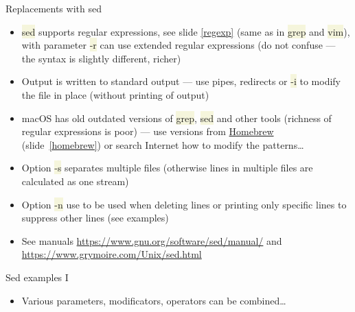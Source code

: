 \documentclass[compress, xelatex, 11pt, xcolor=svgnames, aspectratio=169,
	hyperref={
		bookmarks=true,
		unicode=true,
		colorlinks=true,
		pdftitle={Linux, command line and MetaCentrum},
		plainpages=false,
		pdfauthor={Vojtech Zeisek},
		pdfsubject={Course about use of Linux command line, writing shell scripts and using MetaCentrum of CESNET},
		pdfcreator={XeLaTeX},
		pdfkeywords={Linux, GNU, BASH, shell, command line, MetaCentrum},
		linkcolor=DarkRed, %
		anchorcolor=DarkBlue, %
		citecolor=Indigo, %
		filecolor=NavyBlue, %
		menucolor=DarkMagenta, %
		urlcolor=DarkBlue, %
		},
	url={hyphens, lowtilde} %
	]{beamer}
\renewcommand{\texttt}[1]{\colorbox{Beige}{{\ttfamily #1}}}
\begin{document}
\begin{frame}{Replacements with sed}
	\begin{itemize}
		\item \texttt{sed} supports regular expressions, see slide \ref{regexp} (same as in \texttt{grep} and \texttt{vim}), with parameter \texttt{-r} can use extended regular expressions (do not confuse --- the syntax is slightly different, richer)
		\item Output is written to standard output --- use pipes, redirects or \texttt{-i} to modify the file in place (without printing of output)
		\item macOS has old outdated versions of \texttt{grep}, \texttt{sed} and other tools (richness of regular expressions is poor) --- use versions from \href{http://brew.sh/}{Homebrew} (slide~\ref{homebrew}) or search Internet how to modify the patterns\ldots
		\item Option \texttt{-s} separates multiple files (otherwise lines in multiple files are calculated as one stream)
		\item Option \texttt{-n} use to be used when deleting lines or printing only specific lines to suppress other lines (see examples)
		\item See manuals \url{https://www.gnu.org/software/sed/manual/} and \url{https://www.grymoire.com/Unix/sed.html}
	\end{itemize}
\end{frame}

\begin{frame}[fragile]{Sed examples I}
	\label{sedex}
	\begin{itemize}
		\item Various parameters, modificators, operators can be combined\ldots
	\end{itemize}
\end{frame}
\end{document}
